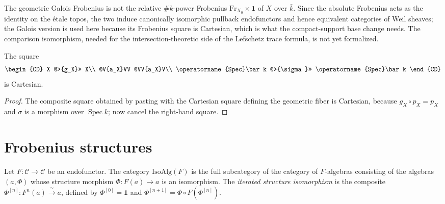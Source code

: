 \begin{remark}
The geometric Galois Frobenius is not the relative \(\#k\)-power Frobenius
\(\mathrm{Fr}_{X_0}\times\mathbf 1\) of \(X\) over \(\bar k\).  Since the
absolute Frobenius acts as the identity on the étale topos, the two induce
canonically isomorphic pullback endofunctors and hence equivalent categories of
Weil sheaves; the Galois version is used here because its Frobenius square is
Cartesian, which is what the compact-support base change needs.  The comparison
isomorphism, needed for the intersection-theoretic side of the Lefschetz trace
formula, is not yet formalized.
\end{remark}

\begin{lemma}\label{lem:weil-frobenius-cartesian}
\leanok
The square
\[
\begin{CD}
X @>{g_X}>> X\\
@V{a_X}VV @VV{a_X}V\\
\operatorname{Spec}\bar k @>{\sigma}>> \operatorname{Spec}\bar k
\end{CD}
\]
is Cartesian.
\end{lemma}
\begin{proof}
\leanok
The composite square obtained by pasting with the Cartesian square defining the
geometric fiber is Cartesian, because \(g_X\circ p_X=p_X\) and
\(\sigma\) is a morphism over \(\operatorname{Spec}k\); now cancel the right-hand
square.
\end{proof}

\section{Frobenius structures}

\begin{definition}\label{def:weil-iso-algebra}
\leanok
Let \(F\colon\mathcal C\to\mathcal C\) be an endofunctor.  The category
\(\mathrm{IsoAlg}(F)\) is the full subcategory of the category of \(F\)-algebras
consisting of the algebras \((a,\Phi)\) whose structure morphism
\(\Phi\colon F(a)\to a\) is an isomorphism.  The \emph{iterated structure
isomorphism} is the composite
\(\Phi^{[n]}\colon F^n(a)\xrightarrow{\ \sim\ }a\), defined by
\(\Phi^{[0]}=\mathbf 1\) and \(\Phi^{[n+1]}=\Phi\circ F(\Phi^{[n]})\).
\end{definition}

